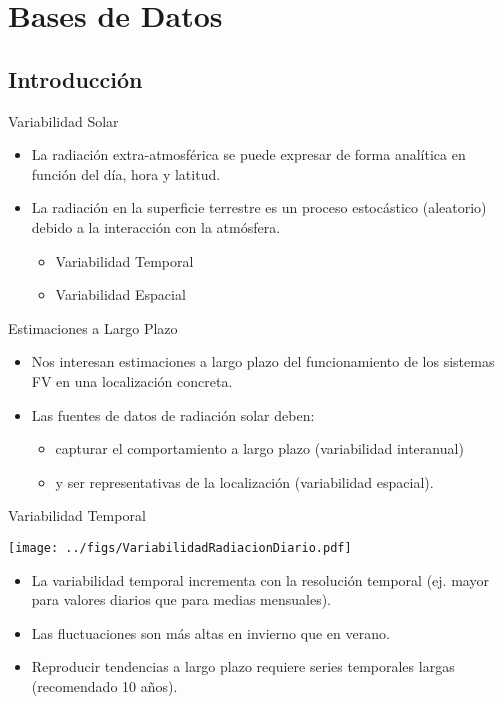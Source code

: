 \documentclass[xcolor={usenames,svgnames,dvipsnames}]{beamer}
\begin{document}
\section{Bases de Datos}
\label{sec:org73d7f7c}
\subsection{Introducción}
\label{sec:org2581b5b}
\begin{frame}[label={sec:orgf7383dd}]{Variabilidad Solar}
\begin{itemize}
\item La \alert{radiación extra-atmosférica} se puede expresar de forma \alert{analítica} en función del día, hora y latitud.
\item La \alert{radiación en la superficie terrestre} es un \alert{proceso estocástico} (aleatorio) debido a la interacción con la atmósfera.
\begin{itemize}
\item Variabilidad Temporal
\item Variabilidad Espacial
\end{itemize}
\end{itemize}
\end{frame}
\begin{frame}[label={sec:org0293ffd}]{Estimaciones a Largo Plazo}
\begin{itemize}
\item Nos interesan \alert{estimaciones a largo plazo} del funcionamiento de los sistemas FV en una localización concreta.
\item Las fuentes de datos de radiación solar deben:
\begin{itemize}
\item \alert{capturar el comportamiento a largo plazo} (variabilidad interanual)
\item y ser \alert{representativas de la localización} (variabilidad espacial).
\end{itemize}
\end{itemize}
\end{frame}

\begin{frame}[label={sec:org663e080}]{Variabilidad Temporal}
\begin{center}
\texttt{[image: ../figs/VariabilidadRadiacionDiario.pdf]}
\end{center}

\begin{itemize}
\item La variabilidad temporal \alert{incrementa con la resolución temporal} (ej. mayor para valores diarios que para medias mensuales).
\item Las fluctuaciones son \alert{más altas en invierno que en verano}.
\item Reproducir \alert{tendencias a largo plazo} requiere \alert{series temporales largas} (recomendado 10 años).
\end{itemize}
\end{frame}
\end{document}
